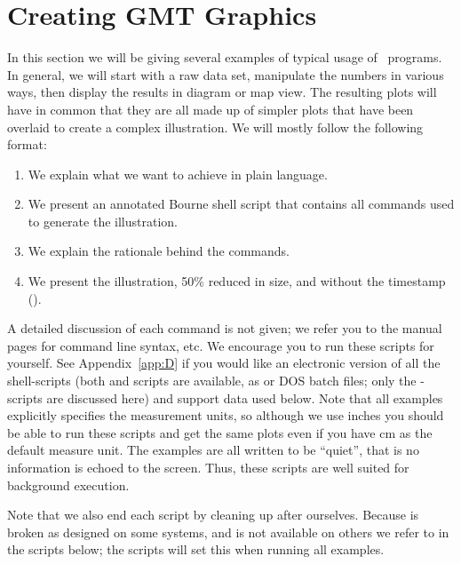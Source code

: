 %
%
\chapter{Creating GMT Graphics}
\label{ch:7}
\thispagestyle{headings}

In this section we will be giving several examples of
typical usage of \GMT\ programs.  In general, we will
start with a raw data set, manipulate the numbers in
various ways, then display the results in diagram or
map view.  The resulting plots will have in common that
they are all made up of simpler plots that have been
overlaid to create a complex illustration.  We will
mostly follow the following format:

\begin{enumerate}
\item We explain what we want to achieve in plain
language.

\item We present an annotated Bourne shell script that contains
all commands used to generate the illustration.

\item We explain the rationale behind the commands.

\item We present the illustration, 50\% reduced in size, and without
the timestamp ().
\end{enumerate}

A detailed discussion of each command is not given;
we refer you to the manual pages for command line
syntax, etc.  We encourage you to run these scripts for yourself.
See Appendix~\ref{app:D} if you would like an electronic version
of all the shell-scripts (both  and  scripts
are available, as or DOS batch files; only the -scripts are discussed here) and support
data used below.  Note that all examples explicitly specifies the
measurement units, so although we use inches you should be able
to run these scripts and get the same plots even if you have cm
as the default measure unit.  The examples are all written to be ``quiet'',
that is no information is echoed to the screen.  Thus,
these scripts are well suited for background execution.

Note that we also end each script by cleaning up after
ourselves. Because  is broken as designed on some
systems, and  is not available on others we refer
to  in the scripts below; the 
scripts will set this when running all examples. 

